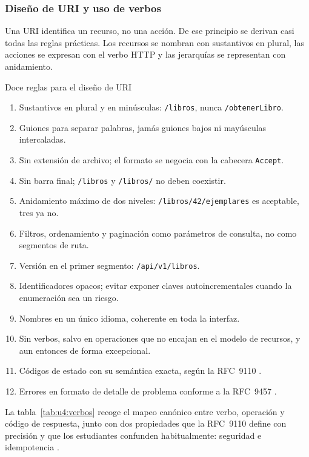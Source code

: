 \documentclass[11pt,a4paper,openany]{book}
\begin{document}
\subsubsection{Diseño de URI y uso de verbos}

Una URI identifica un recurso, no una acción. De ese principio se derivan casi todas las reglas prácticas. Los recursos se nombran con sustantivos en plural, las acciones se expresan con el verbo HTTP y las jerarquías se representan con anidamiento.

\begin{cajabuenas}{Doce reglas para el diseño de URI}
	\begin{enumerate}
		\item Sustantivos en plural y en minúsculas: \texttt{/libros}, nunca \texttt{/obtenerLibro}.
		\item Guiones para separar palabras, jamás guiones bajos ni mayúsculas intercaladas.
		\item Sin extensión de archivo; el formato se negocia con la cabecera \texttt{Accept}.
		\item Sin barra final; \texttt{/libros} y \texttt{/libros/} no deben coexistir.
		\item Anidamiento máximo de dos niveles: \texttt{/libros/42/ejemplares} es aceptable, tres ya no.
		\item Filtros, ordenamiento y paginación como parámetros de consulta, no como segmentos de ruta.
		\item Versión en el primer segmento: \texttt{/api/v1/libros}.
		\item Identificadores opacos; evitar exponer claves autoincrementales cuando la enumeración sea un riesgo.
		\item Nombres en un único idioma, coherente en toda la interfaz.
		\item Sin verbos, salvo en operaciones que no encajan en el modelo de recursos, y aun entonces de forma excepcional.
		\item Códigos de estado con su semántica exacta, según la RFC~9110 \cite{rfc9110}.
		\item Errores en formato de detalle de problema conforme a la RFC~9457 \cite{rfc9457}.
	\end{enumerate}
\end{cajabuenas}

La tabla~\ref{tab:u4:verbos} recoge el mapeo canónico entre verbo, operación y código de respuesta, junto con dos propiedades que la RFC~9110 define con precisión y que los estudiantes confunden habitualmente: seguridad e idempotencia \cite{rfc9110}.
\end{document}
